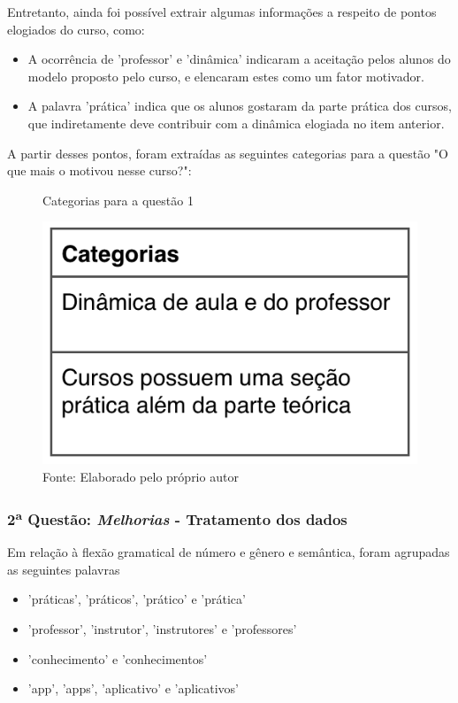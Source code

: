 Entretanto, ainda foi possível extrair algumas informações a respeito de pontos elogiados do curso, como:

\begin{itemize}
\item A ocorrência de 'professor' e 'dinâmica' indicaram a aceitação pelos alunos do modelo proposto pelo curso, e elencaram estes como um fator motivador.
\item A palavra 'prática' indica que os alunos gostaram da parte prática dos cursos, que indiretamente deve contribuir com a dinâmica elogiada no item anterior.
\end{itemize}

A partir desses pontos, foram extraídas as seguintes categorias para a questão "O que mais o motivou nesse curso?":

\begin{figure}[H]
\caption{Categorias para a questão 1}
\centerline{\includegraphics[scale=0.75]{img/categoriasmotivacao}}
\label{fig:categoriasmotivacao}
\caption* {Fonte: Elaborado pelo próprio autor}
\end{figure}

\pagebreak
\subsubsection*{2\textsuperscript{a} Questão: \textit{Melhorias} - Tratamento dos dados }

Em relação à flexão gramatical de número e gênero e semântica, foram agrupadas as seguintes palavras

\begin{itemize}
\item 'práticas', 'práticos', 'prático' e 'prática'
\item 'professor', 'instrutor', 'instrutores' e 'professores'
\item 'conhecimento' e 'conhecimentos'
\item 'app', 'apps', 'aplicativo' e 'aplicativos'
\end{itemize}

